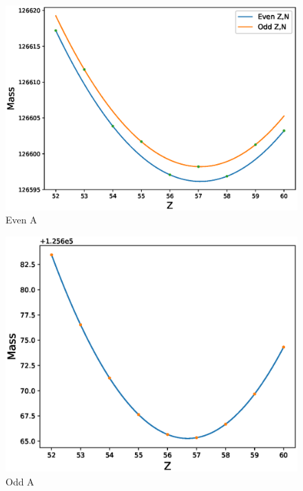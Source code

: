 \begin{figure}[h]
    \centering
    \includegraphics[scale=0.5]{ex2/evenA.eps}
    \caption{Even A}
\end{figure}
\begin{figure}[h]
    \centering
    \includegraphics[scale=0.5]{ex2/oddA.eps}
    \caption{Odd A}
\end{figure}